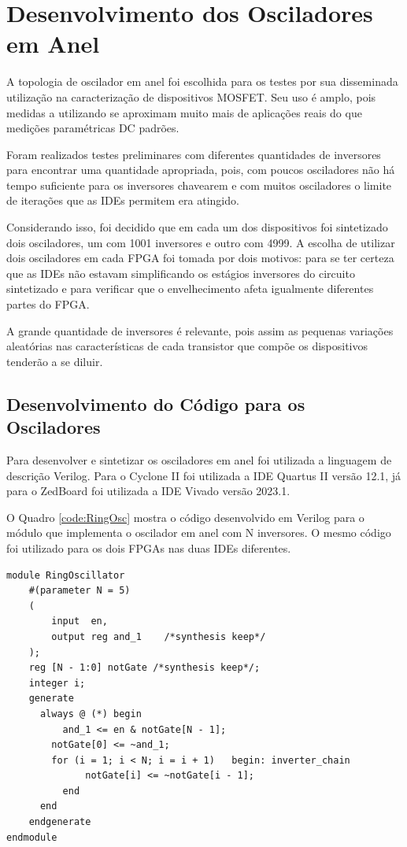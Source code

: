 \section{Desenvolvimento dos Osciladores em Anel}
\label{sec:MetOscilador}

A topologia de oscilador em anel foi escolhida para os testes por sua disseminada utilização na caracterização de dispositivos MOSFET. Seu uso é amplo, pois medidas a utilizando se aproximam muito mais de aplicações reais do que medições paramétricas DC padrões.

Foram realizados testes preliminares com diferentes quantidades de inversores para encontrar uma quantidade apropriada, pois, com poucos osciladores não há tempo suficiente para os inversores chavearem e com muitos osciladores o limite de iterações que as IDEs permitem era atingido.

Considerando isso, foi decidido que em cada um dos dispositivos foi sintetizado dois osciladores, um com 1001 inversores e outro com 4999. A escolha de utilizar dois osciladores em cada FPGA foi tomada por dois motivos: para se ter certeza que as IDEs não estavam simplificando os estágios inversores do circuito sintetizado e para verificar que o envelhecimento afeta igualmente diferentes partes do FPGA.

A grande quantidade de inversores é relevante, pois assim as pequenas variações aleatórias nas características de cada transistor que compõe os dispositivos tenderão a se diluir.

\subsection{Desenvolvimento do Código para os Osciladores}

Para desenvolver e sintetizar os osciladores em anel foi utilizada a linguagem de descrição Verilog. Para o Cyclone II foi utilizada a IDE Quartus II versão 12.1, já para o ZedBoard foi utilizada a IDE Vivado versão 2023.1.

O Quadro \ref{code:RingOsc} mostra o código desenvolvido em Verilog para o módulo que implementa o oscilador em anel com N inversores. O mesmo código foi utilizado para os dois FPGAs nas duas IDEs diferentes.

\begin{lstlisting}[label={code:RingOsc}, style=VerilogStyle, caption={Módulo do Oscilador em Anel. Fonte: O Autor}]
module RingOscillator 
	#(parameter N = 5)
	(
		input  en,
		output reg and_1    /*synthesis keep*/
	);
	reg [N - 1:0] notGate /*synthesis keep*/;
	integer i;
	generate
	  always @ (*) begin
		  and_1 <= en & notGate[N - 1];
	  	notGate[0] <= ~and_1;
	  	for (i = 1; i < N; i = i + 1)   begin: inverter_chain
			  notGate[i] <= ~notGate[i - 1];
		  end
	  end
	endgenerate
endmodule
\end{lstlisting}


